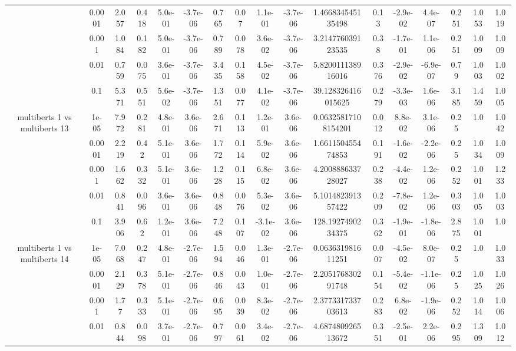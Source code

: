 \begin{tabular}{|c|c|c|c|c|c|c|c|c|c|c|c|c|c|c|c|c|}
 & 0.0001 & 2.057 & 0.418 & 5.0e-01 & -3.7e-06 & 0.765 & 0.07 & 1.1e-01 & -3.7e-06 & 1.466834545135498 & 0.13 & -2.9e-02 & 4.4e-07 & 0.251 & 1.053 & 1.019 \\
 & 0.001 & 1.084 & 0.182 & 5.0e-01 & -3.7e-06 & 0.789 & 0.078 & 3.6e-02 & -3.7e-06 & 3.214776039123535 & 0.38 & -1.7e-01 & 1.1e-06 & 0.251 & 1.009 & 1.009 \\
 & 0.01 & 0.759 & 0.075 & 3.6e-01 & -3.7e-06 & 3.435 & 0.158 & 4.5e-02 & -3.7e-06 & 5.820011138916016 & 0.376 & -2.9e-02 & -6.9e-07 & 0.79 & 1.003 & 1.002 \\
 & 0.1 & 5.371 & 0.551 & 5.6e-02 & -3.7e-06 & 1.351 & 0.077 & 4.1e-02 & -3.7e-06 & 39.128326416015625 & 0.279 & -3.3e-03 & 1.6e-06 & 3.185 & 1.459 & 1.005 \\
\hline
\multirow{5}{*}{multiberts 1 vs multiberts 13} & 1e-05 & 7.972 & 0.281 & 4.8e-01 & 3.6e-06 & 2.671 & 0.113 & 1.2e-01 & 3.6e-06 & 0.06325817108154201 & 0.012 & 8.8e-02 & 3.1e-06 & 0.25 & 1.0 & 1.042 \\
 & 0.0001 & 2.219 & 0.42 & 5.1e-01 & 3.6e-06 & 1.772 & 0.114 & 5.9e-02 & 3.6e-06 & 1.661150455474853 & 0.191 & -1.6e-02 & -2.2e-06 & 0.25 & 1.034 & 1.009 \\
 & 0.001 & 1.662 & 0.332 & 5.1e-01 & 3.6e-06 & 1.228 & 0.115 & 6.8e-02 & 3.6e-06 & 4.200888633728027 & 0.238 & -4.4e-02 & 1.2e-06 & 0.252 & 1.001 & 1.233 \\
 & 0.01 & 0.841 & 0.096 & 3.6e-01 & 3.6e-06 & 0.848 & 0.076 & 5.3e-02 & 3.6e-06 & 5.101482391357422 & 0.209 & -7.8e-02 & 1.2e-06 & 0.303 & 1.005 & 1.003 \\
 & 0.1 & 3.906 & 0.62 & 1.2e-01 & 3.6e-06 & 7.248 & 0.107 & -3.1e-02 & 3.6e-06 & 128.1927490234375 & 0.362 & -1.9e-01 & -1.8e-06 & 2.875 & 1.001 & 1.0 \\
\hline
\multirow{5}{*}{multiberts 1 vs multiberts 14} & 1e-05 & 7.068 & 0.247 & 4.8e-01 & -2.7e-06 & 1.594 & 0.046 & 1.3e-01 & -2.7e-06 & 0.063631981611251 & 0.007 & -4.5e-02 & 8.0e-07 & 0.25 & 1.0 & 1.033 \\
 & 0.0001 & 2.129 & 0.378 & 5.1e-01 & -2.7e-06 & 0.846 & 0.043 & 1.0e-01 & -2.7e-06 & 2.205176830291748 & 0.154 & -5.4e-02 & -1.1e-06 & 0.25 & 1.025 & 1.026 \\
 & 0.001 & 1.77 & 0.333 & 5.1e-01 & -2.7e-06 & 0.695 & 0.039 & 8.3e-02 & -2.7e-06 & 2.377331733703613 & 0.283 & 6.8e-02 & -1.9e-06 & 0.252 & 1.014 & 1.006 \\
 & 0.01 & 0.844 & 0.098 & 3.7e-01 & -2.7e-06 & 0.797 & 0.061 & 3.4e-02 & -2.7e-06 & 4.687480926513672 & 0.351 & -2.5e-01 & 2.2e-06 & 0.295 & 1.309 & 1.012 \\

\end{tabular}
